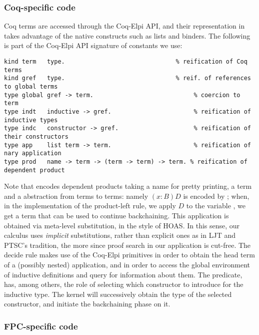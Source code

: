 \subsubsection{Coq-specific code}
Coq terms are accessed through the Coq-Elpi API, and their representation
in \lP takes advantage of the native \lP constructs such as lists and binders.
The following is part of the Coq-Elpi API signature of constants we use:
\begin{lstlisting}[language=lprolog]
kind term   type.                               % reification of Coq terms
kind gref   type.                               % reif. of references to global terms
type global gref -> term.                            % coercion to term
type indt   inductive -> gref.                       % reification of inductive types
type indc   constructor -> gref.                     % reification of their constructors 
type app    list term -> term.                       % reification of nary application
type prod   name -> term -> (term -> term) -> term. % reification of dependent product
\end{lstlisting}
%
Note that  encodes dependent products taking a name for pretty
printing, a term and a \lP abstraction from terms to terms: namely $(x :
B) D$ is encoded by ; when, in the
implementation of the product-left rule, we apply $D$ to the variable
, we get a term that can be used to continue backchaining. This
application is obtained via meta-level substitution, in the style of HOAS. In
this sense, our calculus uses \emph{implicit} substitutions, rather than
explicit ones as in LJT and PTSC's tradition, the more since proof search in
our application is cut-free.
The decide rule makes use of the Coq-Elpi primitives
 in order to obtain the head term of a (possibly
nested) application, and  in order to access the global
environment of inductive definitions and query for information about them.
The  predicate,  has, among others, the role of selecting which
constructor to introduce for the inductive type. The kernel will successively
obtain the type of the selected constructor, and initiate the backchaining
phase on it.

\subsubsection{FPC-specific code}

